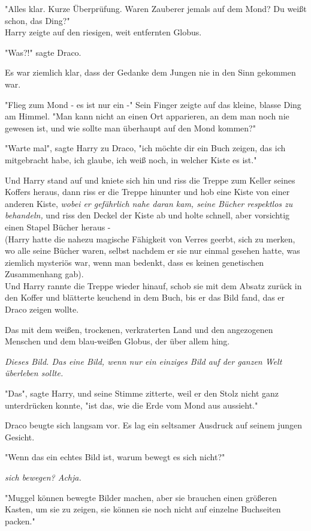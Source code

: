 {"Alles klar. Kurze Überprüfung. Waren Zauberer jemals auf dem Mond? Du weißt schon, das Ding?"\\ Harry zeigte auf den riesigen, weit entfernten Globus.

"Was?!" sagte Draco.

Es war ziemlich klar, dass der Gedanke dem Jungen nie in den Sinn gekommen war.

"Flieg zum Mond - es ist nur ein -" Sein Finger zeigte auf das kleine, blasse Ding am Himmel. "Man kann nicht an einen Ort apparieren, an dem man noch nie gewesen ist, und wie sollte man überhaupt auf den Mond kommen?"

"Warte mal", sagte Harry zu Draco, "ich möchte dir ein Buch zeigen, das ich mitgebracht habe, ich glaube, ich weiß noch, in welcher Kiste es ist."

Und Harry stand auf und kniete sich hin und riss die Treppe zum Keller seines Koffers heraus, dann riss er die Treppe hinunter und hob eine Kiste von einer anderen Kiste, \emph{wobei er gefährlich nahe daran kam, seine Bücher respektlos zu behandeln,} und riss den Deckel der Kiste ab und holte schnell, aber vorsichtig einen Stapel Bücher heraus -\\ (Harry hatte die nahezu magische Fähigkeit von Verres geerbt, sich zu merken, wo alle seine Bücher waren, selbst nachdem er sie nur einmal gesehen hatte, was ziemlich mysteriös war, wenn man bedenkt, dass es keinen genetischen Zusammenhang gab).\\ Und Harry rannte die Treppe wieder hinauf, schob sie mit dem Absatz zurück in den Koffer und blätterte keuchend in dem Buch, bis er das Bild fand, das er Draco zeigen wollte.

Das mit dem weißen, trockenen, verkraterten Land und den angezogenen Menschen und dem blau-weißen Globus, der über allem hing.

\emph{Dieses Bild. Das eine Bild, wenn nur ein einziges Bild auf der ganzen Welt überleben sollte.}

"Das", sagte Harry, und seine Stimme zitterte, weil er den Stolz nicht ganz unterdrücken konnte, "ist das, wie die Erde vom Mond aus aussieht."

Draco beugte sich langsam vor. Es lag ein seltsamer Ausdruck auf seinem jungen Gesicht.

"Wenn das ein echtes Bild ist, warum bewegt es sich nicht?"

\emph{sich bewegen? Achja.}

"Muggel können bewegte Bilder machen, aber sie brauchen einen größeren Kasten, um sie zu zeigen, sie können sie noch nicht auf einzelne Buchseiten packen."

}
